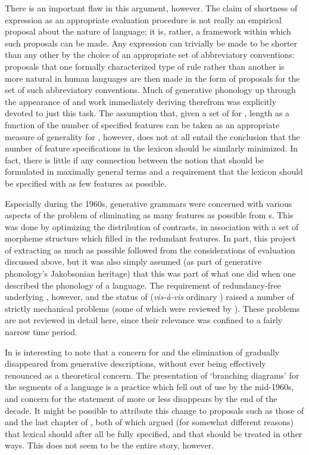 There is an important flaw in this argument, however. The claim of
shortness of expression as an appropriate evaluation procedure is not
really an empirical proposal about the nature of language; it is,
rather, a framework within which such proposals can be made. Any
expression can trivially be made to be shorter than any other by the
choice of an appropriate set of abbreviatory conventions: proposals
that one formally characterized type of rule rather than another is
more natural in human languages are then made in the form of proposals
for the set of such abbreviatory conventions. Much of generative
phonology up through the appearance of \citealt{spe} and work
immediately deriving therefrom was explicitly devoted to just this
task. The assumption that, given a set of  for
, length as a function of the number of specified features can be
taken as an appropriate measure of generality for , however, does
not at all entail the conclusion that the number of feature
specifications in the lexicon should be similarly minimized. In fact,
there is little if any connection between the notion that  should
be formulated in maximally general terms and a requirement that the
lexicon should be specified with as few features as possible.

Especially during the 1960s, generative grammars were concerned with
various aspects of the problem of eliminating as many features as
possible from s. This was done by optimizing
the distribution of contrasts, in association with a set of morpheme
structure  which filled in the redundant features. In part, this
project of extracting as much  as possible followed from the
considerations of evaluation discussed above, but it was also simply
assumed (as part of generative phonology's Jakobsonian heritage) that
this was part of what one did when one described the phonology of a
language. The requirement of redundancy-free underlying
, however, and the status of 
(\emph{vis-à-vis} ordinary ) raised a number of
strictly mechanical problems (some of which were reviewed by
\citet{stanley67:redundancy}). These problems are not reviewed in
detail here, since their relevance was confined to a fairly narrow
time period.

In is interesting to note that a concern for 
and the elimination of  gradually disappeared from
generative descriptions, without ever being effectively renounced as a
theoretical concern. The presentation of `branching diagrams' for the
segments of a language is a practice which fell out of use by the
mid-1960s, and concern for the statement of  more or
less disappears by the end of the decade. It might be possible to
attribute this change to proposals such as those of
\citet{stanley67:redundancy} and the last chapter of \citet{spe}, both
of which argued (for somewhat different reasons) that lexical
 should after all be fully specified, and that
 should be treated in other ways. This does not seem to be
the entire story, however.

